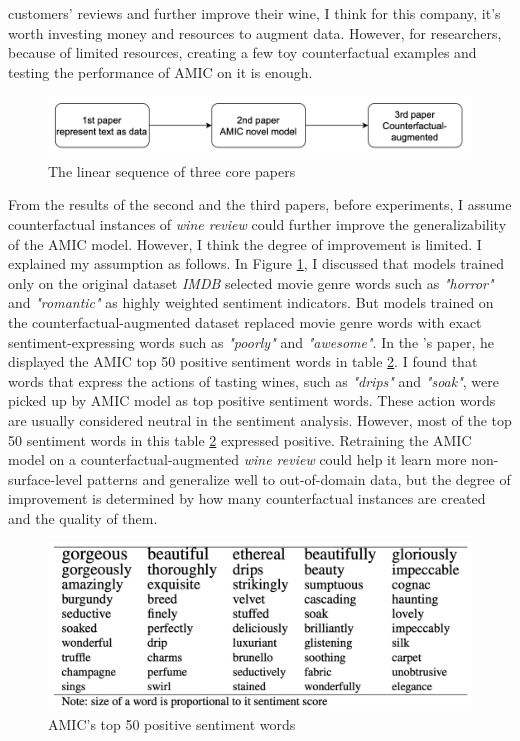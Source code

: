 \documentclass[aoas]{imsart}
\numberwithin{equation}{section}
\theoremstyle{plain}
\theoremstyle{remark}
\begin{document}
customers' reviews and further improve their wine, I think for this company, it's worth investing money and resources to augment data. However, for researchers, because of limited resources, creating a few toy counterfactual examples and testing the performance of AMIC on it is enough. 
\begin{figure}[ht]
\includegraphics[scale=0.7]{img/re.png}
\caption{The linear sequence of three core papers}
\label{Fig9: re}
\end{figure}

From the results of the second and the third papers, before experiments, I assume counterfactual instances of \textit{wine review} could further improve the generalizability of the AMIC model. However, I think the degree of improvement is limited. I explained my assumption as follows. In Figure \ref{Fig9: re}, I discussed that models trained only on the original dataset \textit{IMDB} selected movie genre words such as \textit{"horror"} and \textit{"romantic"} as highly weighted sentiment indicators. But models trained on the counterfactual-augmented dataset replaced movie genre words with exact sentiment-expressing words such as \textit{"poorly"} and \textit{"awesome"}. In the \cite{chenyu}'s paper, he displayed the AMIC top 50 positive sentiment words in table \ref{Fig10: pos}. I found that words that express the actions of tasting wines, such as \textit{"drips"} and \textit{"soak"}, were picked up by AMIC model as top positive sentiment words. These action words are usually considered neutral in the sentiment analysis. However, most of the top 50 sentiment words in this table \ref{Fig10: pos} expressed positive. Retraining the AMIC model on a counterfactual-augmented \textit{wine review} could help it learn more non-surface-level patterns and generalize well to out-of-domain data, but the degree of improvement is determined by how many counterfactual instances are created and the quality of them.
\begin{figure}[ht]
\includegraphics[scale=0.4]{img/pos.png}
\caption{AMIC's top 50 positive sentiment words}
\label{Fig10: pos}
\end{figure}
\end{document}
